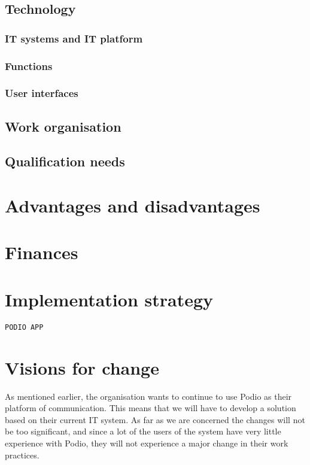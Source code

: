 \subsection{Technology}

\subsubsection{IT systems and IT platform}

\subsubsection{Functions}

\subsubsection{User interfaces}

\subsection{Work organisation}
\label{sub:work_organisation}

\subsection{Qualification needs}
\label{sub:qualification_needs}

\section{Advantages and disadvantages}

\section{Finances}

\section{Implementation strategy}




\texttt{PODIO APP}
\section{Visions for change}
As mentioned earlier, the organisation wants to continue to use Podio as their platform of
communication. This means that we will have to develop a solution based on their current IT system.
As far as we are concerned the changes will not be too significant, and since a lot of the users of
the system have very little experience with Podio, they will not experience a major change in their
work practices. 

